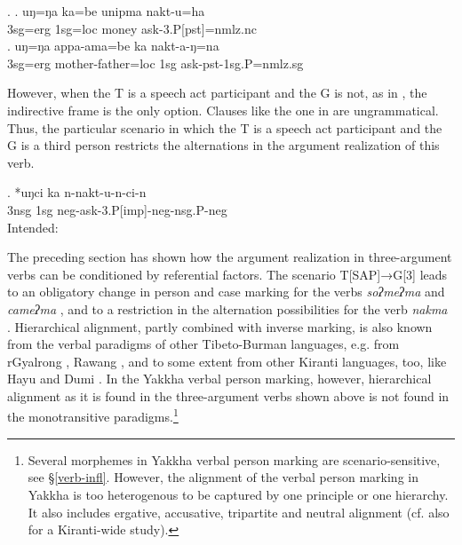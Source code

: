 \ex. \ag. uŋ=ŋa ka=be unipma nakt-u=ha\\
		{\sc 3sg=erg} {\sc 1sg=loc}  money   ask{\sc -3.P[pst]=nmlz.nc}	\\
 	\bg. uŋ=ŋa appa-ama=be ka nakt-a-ŋ=na\\
	{\sc 3sg=erg} mother-father{\sc =loc}  {\sc 1sg}	ask{\sc -pst-1sg.P=nmlz.sg}	\\

However, when the T is a speech act participant and the G is not, as in \Last[b], the indirective frame is the only option. Clauses like the one in \Next are ungrammatical. Thus, the particular scenario in which the T is a speech act participant and the G is a third person restricts the alternations in the argument realization of this verb.

\exg. *uŋci ka n-nakt-u-n-ci-n\\
	{\sc 3nsg} {\sc 1sg} {\sc neg-}ask{\sc -3.P[imp]-neg-nsg.P-neg}\\
	Intended:   


The preceding section has shown how the argument realization in three-argument verbs can be conditioned by referential factors. The scenario  T[SAP]→G[3]  leads to an obligatory change in  person and case marking for the verbs \emph{soʔmeʔma}  and \emph{cameʔma} , and to a restriction in the alternation possibilities for the verb \emph{nakma} . Hierarchical alignment, partly combined with inverse marking, is also known from the verbal paradigms of other Tibeto-Burman languages, e.g. from rGyalrong \citep{Nagano1984A-historical}, Rawang \citep{LaPolla2007Hierarchical}, and to some extent from other Kiranti languages, too, like Hayu and Dumi \citep{Michailovsky2003Hayu, Driem1993A-grammar}. In the Yakkha verbal person marking, however, hierarchical alignment as it is found in the three-argument verbs shown above is not found in the monotransitive paradigms.\footnote{Several morphemes in Yakkha verbal person marking are scenario-sensitive, see §\ref{verb-infl}. However, the alignment of the verbal person marking in Yakkha is too heterogenous to be captured by one principle or one hierarchy. It also includes ergative, accusative, tripartite and neutral alignment (cf. also \citet{Witzlacketal2011_Decomposing} for a Kiranti-wide study).}


 